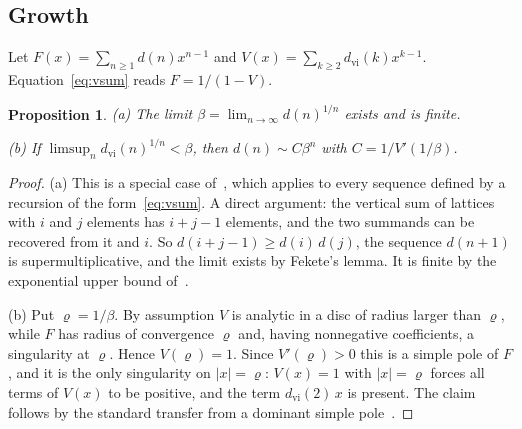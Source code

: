 \documentclass[11pt]{amsart}
\newtheorem{proposition}[theorem]{Proposition}
\theoremstyle{definition}
\theoremstyle{remark}
\begin{document}
\begin{table}[ht]
\centering\setlength{\tabcolsep}{4pt}
\tabledist
\caption{Values of $d(n)$ (A006982) and $d_{\mathrm{vi}}(n)$ (A072361) for $n > 60$.  The
computed values for $n \le 60$ agree with~\cite{Koh21}.  All values for $n \le \Ndist$ are in the ancillary files.}\label{tab:dist}
\end{table}

\subsection{Growth}
Let $F(x) = \sum_{n \ge 1} d(n) x^{n-1}$ and $V(x) = \sum_{k \ge 2} d_{\mathrm{vi}}(k) x^{k-1}$.
Equation~\eqref{eq:vsum} reads $F = 1/(1-V)$.

\begin{proposition}\label{prop:growth}
\textup{(a)} The limit $\beta = \lim_{n\to\infty} d(n)^{1/n}$ exists and is finite.

\textup{(b)} If $\limsup_{n} d_{\mathrm{vi}}(n)^{1/n} < \beta$, then
$d(n) \sim C \beta^n$ with $C = 1/V'(1/\beta)$.
\end{proposition}

\begin{proof}
(a) This is a special case of~\cite[Corollary~11]{EHR}, which applies to every sequence
defined by a recursion of the form~\eqref{eq:vsum}.  A direct argument: the vertical sum of
lattices with $i$ and $j$ elements has $i+j-1$ elements, and
the two summands can be recovered from it and $i$.  So $d(i+j-1) \ge d(i)\,d(j)$, the
sequence $d(n+1)$ is supermultiplicative, and the limit exists by Fekete's lemma.  It
is finite by the exponential upper bound of~\cite{EHR}.

(b) Put $\varrho = 1/\beta$.  By assumption $V$ is analytic in a disc of radius larger
than $\varrho$, while $F$ has radius of convergence $\varrho$ and, having nonnegative
coefficients, a singularity at $\varrho$.  Hence $V(\varrho) = 1$.  Since
$V'(\varrho) > 0$ this is a simple pole of $F$, and it is the only singularity on
$|x| = \varrho$: $V(x) = 1$ with $|x| = \varrho$ forces all terms of $V(x)$ to be
positive, and the term $d_{\mathrm{vi}}(2)\,x$ is present.  The claim follows by the
standard transfer from a dominant simple pole~\cite[Section~V.2]{FS}.
\end{proof}
\end{document}
